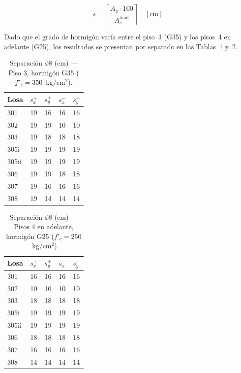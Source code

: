 \begin{equation}
    s = \left\lceil \frac{A_\phi \cdot 100}{A_s^{\text{final}}} \right\rceil \quad [\text{cm}]
\end{equation}
 
Dado que el grado de hormigón varía entre el piso~3 (G35) y los pisos~4 en adelante (G25), los resultados se presentan por separado en las Tablas~\ref{tab:arm-p3} y~\ref{tab:arm-p4}.
 
\begin{table}[h!]
\centering
\caption{Separación $\phi 8$ (cm) --- Piso 3, hormigón G35 ($f'_c = 350$~kg/cm$^2$).}
\label{tab:arm-p3}
\begin{tabular}{lcccc}
\toprule
Losa & $s_{x}^{+}$ & $s_{y}^{+}$ & $s_{x}^{-}$ & $s_{y}^{-}$ \\
\midrule
301   & 19 & 16 & 16 & 16 \\
302   & 19 & 19 & 10 & 10 \\
303   & 19 & 18 & 18 & 18 \\
305i  & 19 & 19 & 19 & 19 \\
305ii & 19 & 19 & 19 & 19 \\
306   & 19 & 19 & 18 & 18 \\
307   & 19 & 16 & 16 & 16 \\
308   & 19 & 14 & 14 & 14 \\
\bottomrule
\end{tabular}
\end{table}
 
\begin{table}[h!]
\centering
\caption{Separación $\phi 8$ (cm) --- Pisos 4 en adelante, hormigón G25 ($f'_c = 250$~kg/cm$^2$).}
\label{tab:arm-p4}
\begin{tabular}{lcccc}
\toprule
Losa & $s_{x}^{+}$ & $s_{y}^{+}$ & $s_{x}^{-}$ & $s_{y}^{-}$ \\
\midrule
301   & 16 & 16 & 16 & 16 \\
302   & 10 & 10 & 10 & 10 \\
303   & 18 & 18 & 18 & 18 \\
305i  & 19 & 19 & 19 & 19 \\
305ii & 19 & 19 & 19 & 19 \\
306   & 18 & 18 & 18 & 18 \\
307   & 16 & 16 & 16 & 16 \\
308   & 14 & 14 & 14 & 14 \\
\bottomrule
\end{tabular}
\end{table}
 
